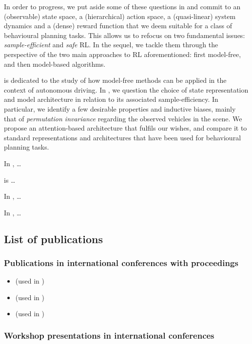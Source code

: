 In order to progress, we put aside some of these questions in  and commit to an (observable) state space, a (hierarchical) action space, a (quasi-linear) system dynamics and a (dense) reward function that we deem suitable for a class of behavioural planning tasks. This allows us to refocus on two fundamental issues: \textit{sample-efficient} and \textit{safe} \acl*{RL}. In the sequel, we tackle them through the perspective of the two main approaches to \acl*{RL} aforementioned: first model-free, and then model-based algorithms.

 is dedicated to the study of how model-free methods can be applied in the context of autonomous driving. In , we question the choice of state representation and model architecture in relation to its associated sample-efficiency. In particular, we identify a few desirable properties and inductive biases, mainly that of \emph{permutation invariance} regarding the observed vehicles in the scene. We propose an attention-based architecture that fulfils our wishes, and compare it to standard representations and architectures that have been used for behavioural planning tasks. 

In , \dots 

 is \dots

In , \dots 

In , \dots

\subsection*{List of publications}

\subsubsection*{Publications in international conferences with proceedings}

\begin{itemize}
	\item {} (used in )
	\item {} (used in )
	\item {} (used in )
\end{itemize}

\subsubsection*{Workshop presentations in international conferences}

